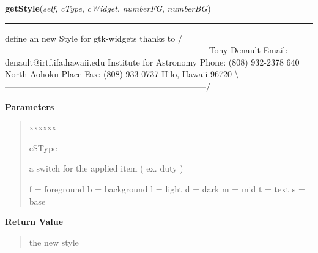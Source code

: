     \vspace{0.5ex}

\hspace{.8\funcindent}\begin{boxedminipage}{\funcwidth}

    \raggedright \textbf{getStyle}(\textit{self}, \textit{cType}, \textit{cWidget}, \textit{numberFG}, \textit{numberBG})

    \vspace{-1.5ex}

    \rule{\textwidth}{0.5\fboxrule}
\setlength{\parskip}{2ex}
    define an new Style for gtk-widgets thanks to 
    /-----------------------------------------------------------------------
    {\textbar} Tony Denault                     {\textbar} Email: 
    denault@irtf.ifa.hawaii.edu {\textbar} {\textbar} Institute for 
    Astronomy          {\textbar}              Phone: (808) 932-2378 
    {\textbar} {\textbar} 640 North Aohoku Place           {\textbar}
    Fax: (808) 933-0737 {\textbar} {\textbar} Hilo, Hawaii 96720
    {\textbar}                                    {\textbar} 
    {\textbackslash}-----------------------------------------------------------------------/

\setlength{\parskip}{1ex}
      \textbf{Parameters}
      \vspace{-1ex}

      \begin{quote}
        \begin{Ventry}{xxxxxx}

          \item[cSType]

          a switch for the applied item ( ex. duty )

          f = foreground b = background l = light d = dark m = mid t = text
          s = base

        \end{Ventry}

      \end{quote}

      \textbf{Return Value}
    \vspace{-1ex}

      \begin{quote}
      the new style

      \end{quote}

    \end{boxedminipage}

    \label{cuon:Windows:windows:windows:getWhere}

